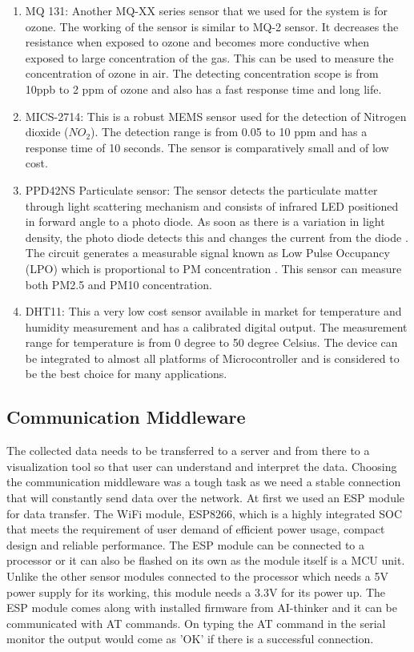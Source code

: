 \begin{enumerate}
\item MQ 131: Another MQ-XX series sensor that we used for the system is for ozone. The working of the sensor is similar to MQ-2 sensor. It decreases the resistance when exposed to ozone and becomes more conductive when exposed to large concentration of the gas. This can be used to measure the concentration of ozone in air. The detecting concentration scope is from 10ppb to 2 ppm of ozone and also has a fast response time and long life.

\item MICS-2714: This is a robust MEMS sensor used for the detection of Nitrogen dioxide ($NO_2$). The detection range is from 0.05 to 10 ppm and has a response time of 10 seconds. The sensor is comparatively small and of low cost.

\item  PPD42NS Particulate sensor: The sensor detects the particulate matter through light scattering mechanism and consists of infrared LED positioned in forward angle to a photo diode. As soon as there is a variation in light density, the photo diode detects this and changes the current from the diode \cite{Allen2002}. The circuit generates a measurable signal known as Low Pulse Occupancy (LPO) which is proportional to PM concentration \cite{Kuula2017}. This sensor can measure both PM2.5 and PM10 concentration.

\item DHT11: This a very low cost sensor available in market for temperature and humidity measurement and has a calibrated digital output. The measurement range for temperature is from 0 degree to 50 degree Celsius. The device can be integrated to almost all platforms of Microcontroller and is considered to be the best choice for many applications.

 \end{enumerate}

 \subsection{Communication Middleware}
 
 The collected data needs to be transferred to a server and from there to a visualization tool so that user can understand and interpret the data. Choosing the communication middleware was a tough task as we need a stable connection that will constantly send data over the network. At first we used an ESP module for data transfer. The WiFi module, ESP8266, which is a highly integrated SOC that meets the requirement of user demand of efficient power usage, compact design and reliable performance\cite{Systems2018}. The ESP module can be connected to a processor or it can also be flashed on its own as the module itself is a MCU unit. Unlike the other sensor modules connected to the processor which needs a 5V power supply for its working, this module needs a 3.3V for its power up. The ESP module comes along with installed firmware from AI-thinker and it can be communicated with AT commands. On typing the AT command in the serial monitor the output would come as 'OK' if there is a successful connection. 

